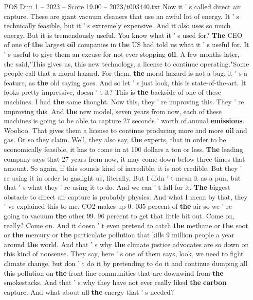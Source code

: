\begin{textsample}{POS Dim 1 – 2023 – Score 19.00 – 2023/t003440.txt}
Now it ' s called direct air capture.
These are giant vacuum cleaners that use an awful lot of energy.
It ' s technically feasible, but it ' s extremely expensive.
And it also uses so much energy.
But it is tremendously useful.
You know what it ' s used for? \textbf{The} CEO of one of \textbf{the} largest \textbf{oil} companies in \textbf{the} US had told us what it ' s useful for.
It ' s useful to give them an excuse for not ever stopping \textbf{oil}.
A few months later, she said,"This gives us, this new technology, a license to continue operating."Some people call that a moral hazard.
For them, \textbf{the} moral hazard is not a bug, it ' s a feature, as \textbf{the} old saying goes.
And so let ' s just look, this is state-of-the-art.
It looks pretty impressive, doesn ' t it?
This is \textbf{the} backside of one of these machines.
I had \textbf{the} same thought.
Now this, they ' re improving this.
They ' re improving this.
And \textbf{the} new model, seven years from now, each of these machines is going to be able to capture 27 seconds ' worth of annual \textbf{emissions}.
Woohoo.
That gives them a license to continue producing more and more \textbf{oil} and gas.
Or so they claim.
Well, they also say, \textbf{the} experts, that in order to be economically feasible, it has to come in at 100 dollars a ton or less. \textbf{The} leading company says that 27 years from now, it may come down below three times that amount.
So again, if this sounds kind of incredible, it is not credible.
But they ' re using it in order to gaslight us, literally.
But I didn ' t mean it as a pun, but that ' s what they ' re using it to do.
And we can ' t fall for it. \textbf{The} biggest obstacle to direct air capture is probably physics.
And what I mean by that, they ' ve explained this to me.
CO2 makes up 0. 035 percent of \textbf{the} air so we ' re going to vacuum \textbf{the} other 99. 96 percent to get that little bit out.
Come on, really?
Come on.
And it doesn ' t even pretend to catch \textbf{the} methane or \textbf{the} soot or \textbf{the} mercury or \textbf{the} particulate pollution that kills 9 million people a year around \textbf{the} world.
And that ' s why \textbf{the} climate justice advocates are so down on this kind of nonsense.
They say, here ' s one of them says, look, we need to fight climate change, but don ' t do it by pretending to do it and continue dumping all this pollution on \textbf{the} front line communities that are downwind from \textbf{the} smokestacks.
And that ' s why they have not ever really liked \textbf{the} \textbf{carbon} capture.
And what about all \textbf{the} energy that ' s needed?

\end{textsample}
